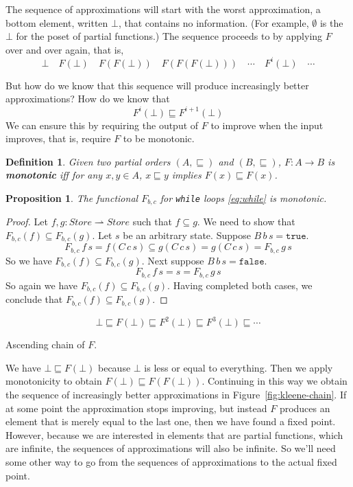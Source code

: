 \documentclass{tufte-handout}
\newcommand{\TRUE}[0]{\mathtt{true}}
\newcommand{\FALSE}[0]{\mathtt{false}}
\newcommand{\pto}[0]{\rightharpoonup}
\newtheorem{proposition}[theorem]{Proposition}
\newtheorem{definition}{Definition}%
\begin{document}
The sequence of approximations will start with the worst
approximation, a bottom element, written $\bot$, that contains no
information. (For example, $\emptyset$ is the $\bot$ for the poset of
partial functions.)
The sequence proceeds to by applying $F$ over and over again, that is,
\[
  \bot \quad F(\bot)\quad F(F(\bot))\quad F(F(F(\bot)))\quad \cdots\quad F^i(\bot)\quad \cdots
\]

But how do we know that this sequence will produce increasingly better
approximations?  How do we know that
\[
F^i(\bot) \sqsubseteq F^{i+1}(\bot)
\]
We can ensure this by requiring the output of $F$ to improve when the
input improves, that is, require $F$ to be monotonic.

\begin{definition}
  Given two partial orders $(A,\sqsubseteq)$ and
  $(B,\sqsubseteq)$, $F : A {\to} B$ is \textbf{\emph{monotonic}} iff
  for any $x,y\in A$, $x \sqsubseteq y$ implies $F(x) \sqsubseteq F(x)$.
\end{definition}

\begin{proposition}
  The functional $F_{b,c}$ for \texttt{while} loops \eqref{eq:while}
  is monotonic.
\end{proposition}
\begin{proof}
  Let $f, g : \mathit{Store} \pto \mathit{Store}$ such that
  $f \subseteq g$. We need to show that $F_{b,c}(f) \subseteq
  F_{b,c}(g)$. 
  Let $s$ be an arbitrary state. Suppose $B\,b\,s = \TRUE$.
  \[
  F_{b,c}\,f\,s = f(C\,c\,s) \subseteq g(C\,c\,s) = g(C\,c\,s) = F_{b,c}\,g\,s 
  \]
  So we have $F_{b,c}(f) \subseteq F_{b,c}(g)$.
  Next suppose $B\,b\,s = \FALSE$.
  \[
  F_{b,c}\,f\,s = s
               = F_{b,c}\,g\,s 
  \]
  So again we have $F_{b,c}(f) \subseteq F_{b,c}(g)$.  Having
  completed both cases, we conclude that $F_{b,c}(f) \subseteq
  F_{b,c}(g)$.
\end{proof}


\begin{marginfigure}
\[
  \bot \sqsubseteq F(\bot) \sqsubseteq F^2(\bot) 
    \sqsubseteq F^3(\bot) \sqsubseteq \cdots
\]
\caption{Ascending chain of $F$.}
\label{fig:kleene-chain}
\end{marginfigure}
%
We have $\bot \sqsubseteq F(\bot)$ because $\bot$ is less or equal to
everything. Then we apply monotonicity to obtain $F(\bot) \sqsubseteq
F(F(\bot))$.  Continuing in this way we obtain the sequence of
increasingly better approximations in Figure~\ref{fig:kleene-chain}.
If at some point the approximation stops improving, but instead $F$
produces an element that is merely equal to the last one, then we have
found a fixed point. However, because we are interested in elements
that are partial functions, which are infinite, the sequences of
approximations will also be infinite. So we'll need some other way to
go from the sequences of approximations to the actual fixed point.
\end{document}
